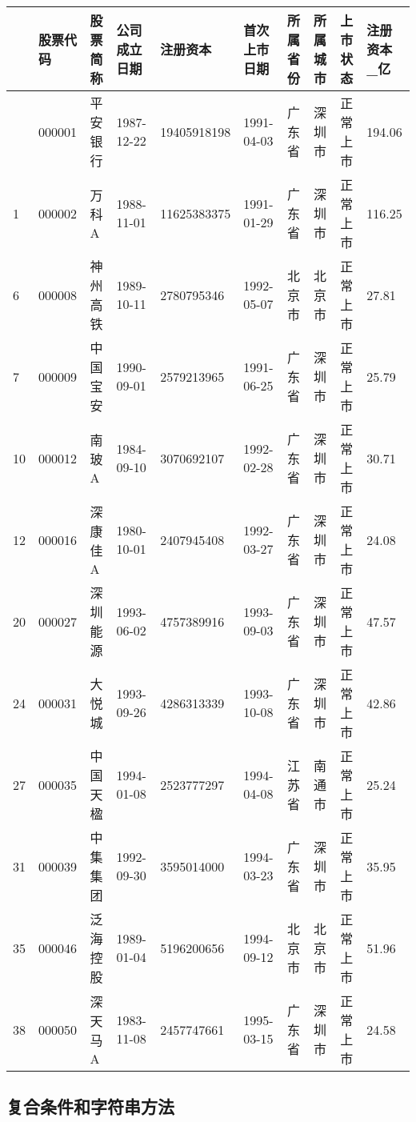 \documentclass[
  letterpaper,
  DIV=11,
  numbers=noendperiod]{scrreprt}
\begin{document}
\begin{longtable}[]{@{}llllllllll@{}}
\toprule\noalign{}
& 股票代码 & 股票简称 & 公司成立日期 & 注册资本 & 首次上市日期 &
所属省份 & 所属城市 & 上市状态 & 注册资本\_亿 \\
\midrule\noalign{}
\endhead
\bottomrule\noalign{}
\endlastfoot
0 & 000001 & 平安银行 & 1987-12-22 & 19405918198 & 1991-04-03 & 广东省 &
深圳市 & 正常上市 & 194.06 \\
1 & 000002 & 万科A & 1988-11-01 & 11625383375 & 1991-01-29 & 广东省 &
深圳市 & 正常上市 & 116.25 \\
6 & 000008 & 神州高铁 & 1989-10-11 & 2780795346 & 1992-05-07 & 北京市 &
北京市 & 正常上市 & 27.81 \\
7 & 000009 & 中国宝安 & 1990-09-01 & 2579213965 & 1991-06-25 & 广东省 &
深圳市 & 正常上市 & 25.79 \\
10 & 000012 & 南玻A & 1984-09-10 & 3070692107 & 1992-02-28 & 广东省 &
深圳市 & 正常上市 & 30.71 \\
12 & 000016 & 深康佳A & 1980-10-01 & 2407945408 & 1992-03-27 & 广东省 &
深圳市 & 正常上市 & 24.08 \\
20 & 000027 & 深圳能源 & 1993-06-02 & 4757389916 & 1993-09-03 & 广东省 &
深圳市 & 正常上市 & 47.57 \\
24 & 000031 & 大悦城 & 1993-09-26 & 4286313339 & 1993-10-08 & 广东省 &
深圳市 & 正常上市 & 42.86 \\
27 & 000035 & 中国天楹 & 1994-01-08 & 2523777297 & 1994-04-08 & 江苏省 &
南通市 & 正常上市 & 25.24 \\
31 & 000039 & 中集集团 & 1992-09-30 & 3595014000 & 1994-03-23 & 广东省 &
深圳市 & 正常上市 & 35.95 \\
35 & 000046 & 泛海控股 & 1989-01-04 & 5196200656 & 1994-09-12 & 北京市 &
北京市 & 正常上市 & 51.96 \\
38 & 000050 & 深天马A & 1983-11-08 & 2457747661 & 1995-03-15 & 广东省 &
深圳市 & 正常上市 & 24.58 \\
\end{longtable}

\hypertarget{ux590dux5408ux6761ux4ef6ux548cux5b57ux7b26ux4e32ux65b9ux6cd5}{%
\subsection{复合条件和字符串方法}\label{ux590dux5408ux6761ux4ef6ux548cux5b57ux7b26ux4e32ux65b9ux6cd5}}
\end{document}
